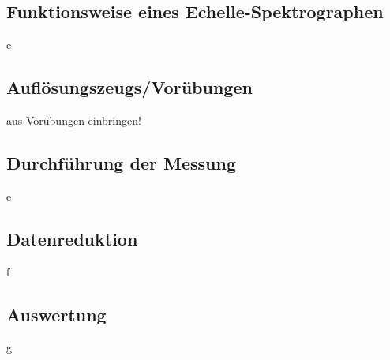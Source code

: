 \subsection{Funktionsweise eines Echelle-Spektrographen}
c

\subsection{Auflösungszeugs/Vorübungen}
aus Vorübungen einbringen!

\subsection{Durchführung der Messung}
e

\subsection{Datenreduktion}
f

\subsection{Auswertung}
g

